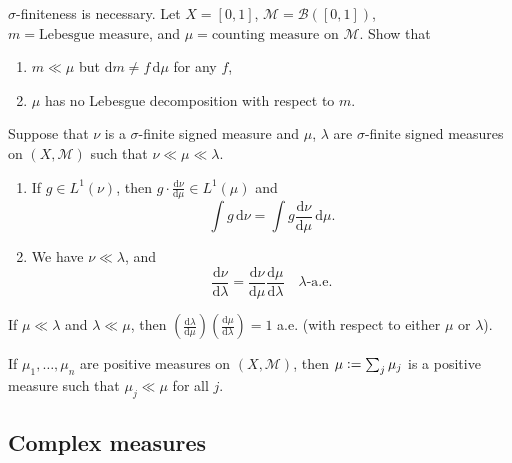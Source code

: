 \documentclass[12pt]{article}	%
\begin{document}
\begin{exe}
	$\sigma$-finiteness is necessary. Let $X = [0, 1]$, $\mathcal{M} = \mathcal{B}([0, 1])$, $m = \text{Lebesgue measure}$, and $\mu = \text{counting measure}$ on $\mathcal{M}$. Show that
	\begin{enumerate}
		\item $m \ll \mu$ but ${\mathrm d} m \neq f \,{\mathrm d} \mu$ for any $f$,
		\item $\mu$ has no Lebesgue decomposition with respect to $m$.
	\end{enumerate}
\end{exe}

\begin{prop}
	Suppose that $\nu$ is a $\sigma$-finite signed measure and $\mu$, $\lambda$ are $\sigma$-finite signed measures on $(X, \mathcal{M})$ such that $\nu \ll \mu \ll \lambda$.
	\begin{enumerate}
		\item If $g \in L^{1}(\nu)$, then $g \cdot \frac{{\mathrm d} \nu}{{\mathrm d} \mu} \in L^{1}(\mu)$ and
		\begin{equation*} 
			\int g \,{\mathrm{d}}\nu = \int g \frac{{\mathrm d} \nu}{{\mathrm d} \mu} \,{\mathrm{d}}\mu.
		\end{equation*}
		\item We have $\nu \ll \lambda$, and
		\begin{equation*} 
			\frac{{\mathrm d} \nu}{{\mathrm d} \lambda} = \frac{{\mathrm d} \nu}{{\mathrm d} \mu}\frac{{\mathrm d} \mu}{{\mathrm d} \lambda} \quad \lambda \text{-a.e.}
		\end{equation*}
	\end{enumerate}
\end{prop}

\begin{cor}
	If $\mu \ll \lambda$ and $\lambda \ll \mu$, then $(\frac{{\mathrm d} \lambda}{{\mathrm d} \mu})(\frac{{\mathrm d} \mu}{{\mathrm d} \lambda}) = 1$ a.e. (with respect to either $\mu$ or $\lambda$).
\end{cor}

\begin{obs}
	If $\mu_{1}, \ldots, \mu_{n}$ are positive measures on $(X, \mathcal{M})$, then $\mu \vcentcolon= \sum_{j} \mu_{j}$ is a positive measure such that $\mu_{j} \ll \mu$ for all $j$.
\end{obs}

\subsection{Complex measures}
\end{document}
